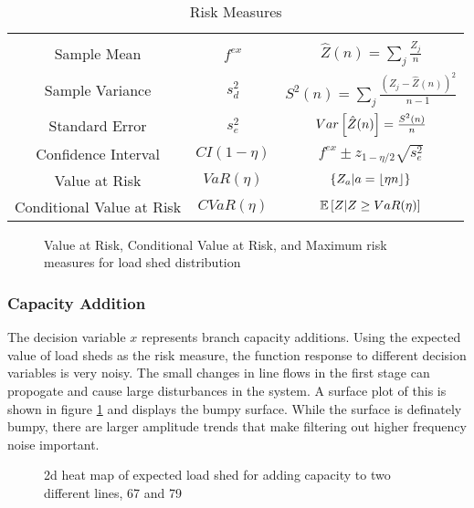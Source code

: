 \newcommand{\tabheight}{11pt}
\begin{table}
\centering
\begin{tabular}{| c | c | c|}
\hline
& & \\[1pt]
Sample Mean & $f^{ex}$ &$ \hat{Z}(n)=\sum_j \frac{Z_j}{n} $\\[\tabheight]
Sample Variance & $s^2_d$ &$ S^2(n)=\sum_j \frac{\left(Z_j - \hat{Z}(n)\right)^2}{n-1} $\\[\tabheight]
Standard Error & $s^2_e$ &$ Var\left[ \hat{Z}(n) \right]= \frac{S^2(n)}{n}$\\[\tabheight]
Confidence Interval& $CI(1-\eta)$  & $f^{ex} \pm z_{1-\eta/2} \sqrt{s^2_e}$ \\[\tabheight]
Value at Risk & $ VaR(\eta)$& $ \left\{ Z_{a} |  a = \lfloor  \eta n  \rfloor\right\} $\\[\tabheight]  %
Conditional Value at Risk & $ CVaR(\eta)$& $\mathbb{E}\left[ Z | Z \geq VaR(\eta) \right]$ \\[\tabheight]
\hline
\end{tabular}
\caption{Risk Measures}\label{tab:risk}
\end{table}

\begin{figure}
\centering

\caption{Value at Risk, Conditional Value at Risk, and Maximum risk measures for load shed distribution}
\end{figure}

\subsubsection{Capacity Addition}
The decision variable $x$ represents branch capacity additions.   Using the expected value of load sheds as the risk measure, the function response to different decision variables is very noisy.  The small changes in line flows in the first stage can propogate and cause large disturbances in the system.  A surface plot of this is shown in figure \ref{fig:heatmap} and displays the bumpy surface.  While the surface is definately bumpy, there are larger amplitude trends that make filtering out higher frequency noise important.  


\begin{figure}
\centering

\caption{2d heat map of expected load shed for adding capacity to two different lines, 67 and 79}\label{fig:heatmap}
\end{figure}

